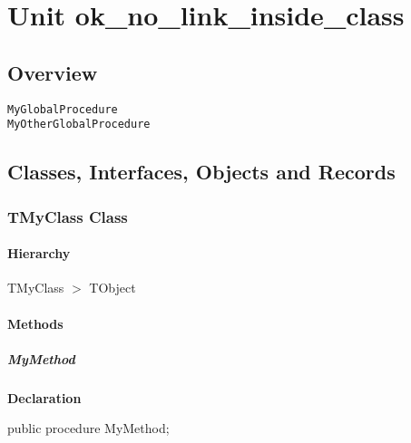 \documentclass{report}
\begin{document}
\newlength{\tmplength}
\chapter{Unit ok{\_}no{\_}link{\_}inside{\_}class}
\section{Overview}
\begin{description}
\item[\texttt{\begin{ttfamily}TMyClass\end{ttfamily} Class}]
\end{description}
\begin{description}
\item[\texttt{MyGlobalProcedure}]
\item[\texttt{MyOtherGlobalProcedure}]
\end{description}
\section{Classes, Interfaces, Objects and Records}
\subsection*{TMyClass Class}
\subsubsection*{\large{\textbf{Hierarchy}}\normalsize\hspace{1ex}\hfill}
TMyClass {$>$} TObject
\subsubsection*{\large{\textbf{Methods}}\normalsize\hspace{1ex}\hfill}
\paragraph*{MyMethod}\hspace*{\fill}

\begin{list}{}{
\setlength{\itemindent}{0cm}
\setlength{\listparindent}{0cm}
\setlength{\leftmargin}{\evensidemargin}
\addtolength{\leftmargin}{\tmplength}
\settowidth{\labelsep}{X}
\addtolength{\leftmargin}{\labelsep}
\setlength{\labelwidth}{\tmplength}
}
\begin{flushleft}
\item[\textbf{Declaration}\hfill]
\begin{ttfamily}
public procedure MyMethod;\end{ttfamily}


\end{flushleft}
\end{list}
\end{document}
